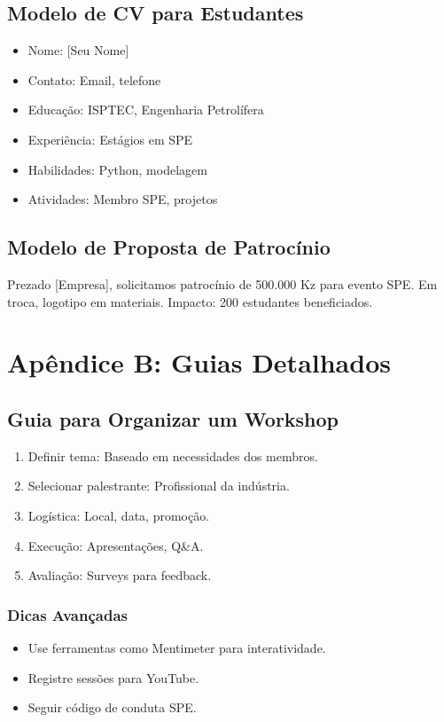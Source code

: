 \documentclass[12pt]{article}
\begin{document}
\subsection{Modelo de CV para Estudantes}
\begin{itemize}
    \item Nome: [Seu Nome]
    \item Contato: Email, telefone
    \item Educação: ISPTEC, Engenharia Petrolífera
    \item Experiência: Estágios em SPE
    \item Habilidades: Python, modelagem
    \item Atividades: Membro SPE, projetos
\end{itemize}

\subsection{Modelo de Proposta de Patrocínio}
Prezado [Empresa], solicitamos patrocínio de 500.000 Kz para evento SPE. Em troca, logotipo em materiais. Impacto: 200 estudantes beneficiados.

\clearpage
\section{Apêndice B: Guias Detalhados}

\subsection{Guia para Organizar um Workshop}
\begin{enumerate}
    \item Definir tema: Baseado em necessidades dos membros.
    \item Selecionar palestrante: Profissional da indústria.
    \item Logística: Local, data, promoção.
    \item Execução: Apresentações, Q\&A.
    \item Avaliação: Surveys para feedback.
\end{enumerate}

\subsubsection{Dicas Avançadas}
\begin{itemize}
    \item Use ferramentas como Mentimeter para interatividade.
    \item Registre sessões para YouTube.
    \item Seguir código de conduta SPE.
\end{itemize}
\end{document}
